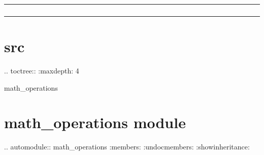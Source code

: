 \documentclass[a4paper,10pt,oneside,spanish,openany]{sphinxmanual}
\begin{document}
\bigskip\hrule\bigskip



\subsubsection{}
\label{\detokenize{comandos_mas_usados/comandos:actualizar-dependencias}}
\begin{sphinxVerbatim}[commandchars=\\\{\}]
    
\end{sphinxVerbatim}


\bigskip\hrule\bigskip


\sphinxstepscope


\section{src}
\label{\detokenize{modules:src}}\label{\detokenize{modules::doc}}
\sphinxAtStartPar
.. toctree::
:maxdepth: 4

\sphinxAtStartPar
math\_operations

\sphinxstepscope


\section{math\_operations module}
\label{\detokenize{math_operations:math-operations-module}}\label{\detokenize{math_operations::doc}}
\sphinxAtStartPar
.. automodule:: math\_operations
:members:
:undoc\sphinxhyphen{}members:
:show\sphinxhyphen{}inheritance:



\renewcommand{\indexname}{Índice}
\printindex
\end{document}
